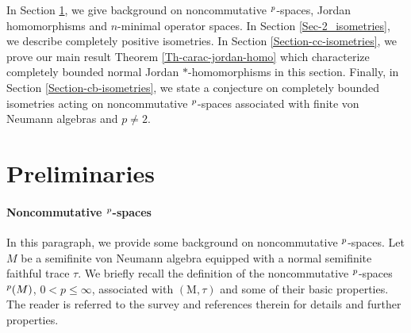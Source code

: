 \documentclass[leqno]{article} %
\let\L\relax
\newcommand{\L}{\mathrm{L}}
\newcommand{\M}{\mathrm{M}}
\renewcommand{\leq}{\ensuremath{\leqslant}}
\numberwithin{equation}{section}
\begin{document}



In Section \ref{sec:preliminaries}, we give background on noncommutative $\L^p$-spaces, Jordan homomorphisms and $n$-minimal operator spaces. In Section \ref{Sec-2_isometries}, we describe completely positive isometries. In Section \ref{Section-cc-isometries}, we prove our main result Theorem \ref{Th-carac-jordan-homo} which characterize completely bounded normal Jordan $*$-homomorphisms in this section. Finally, in Section \ref{Section-cb-isometries}, we state a conjecture on completely bounded isometries acting on noncommutative $\L^p$-spaces associated with finite von Neumann algebras and $p \not=2$.

\section{Preliminaries}
\label{sec:preliminaries}

\paragraph{Noncommutative $\L^p$-spaces} In this paragraph, we provide some background on noncommutative $\L^p$-spaces. Let $M$ be a semifinite von Neumann algebra equipped with a normal semifinite faithful trace $\tau$. We briefly recall the definition of the noncommutative $\L^p$-spaces $\L^p(M)$,  $0< p \leq \infty$, associated with $(\M,\tau)$ and some of their basic properties. The reader is referred to the survey \cite{PiX} and references therein for details and further properties.
\end{document}

